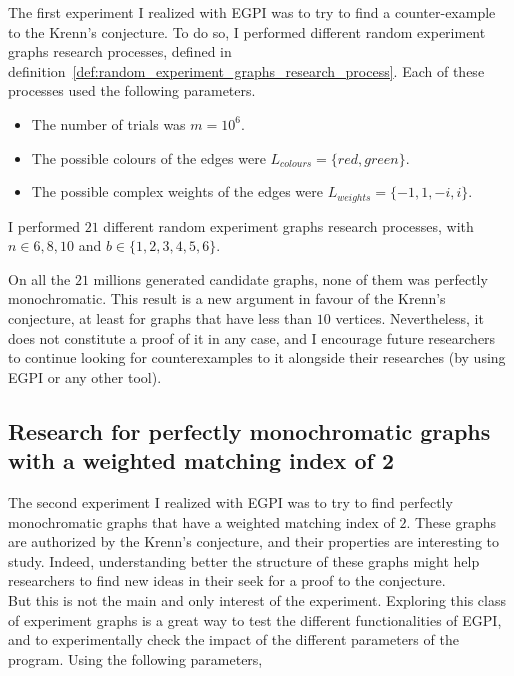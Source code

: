 The first experiment I realized with EGPI was to try to find a counter-example to the Krenn's conjecture.
To do so, I performed different random experiment graphs research processes, defined in definition~\ref{def:random_experiment_graphs_research_process}.
Each of these processes used the following parameters.

\begin{itemize}
    \item The number of trials was $m = 10^6$.
    \item The possible colours of the edges were $L_{colours} = \{red, green\}$.
    \item The possible complex weights of the edges were $L_{weights} = \{-1, 1, -i, i\}$.
\end{itemize}

I performed $21$ different random experiment graphs research processes, with $n \in {6, 8, 10}$ and $b \in \{1, 2, 3, 4, 5, 6\}$.

On all the $21$ millions generated candidate graphs, none of them was perfectly monochromatic.
This result is a new argument in favour of the Krenn's conjecture, at least for graphs that have less than $10$ vertices.
Nevertheless, it does not constitute a proof of it in any case, and I encourage future researchers to continue looking for counterexamples to it alongside their researches (by using EGPI or any other tool). \\


\subsection{Research for perfectly monochromatic graphs with a weighted matching index of 2}
\label{subsec:research-for-graphs-with-c-of-2}

The second experiment I realized with EGPI was to try to find perfectly monochromatic graphs that have a weighted matching index of $2$.
These graphs are authorized by the Krenn's conjecture, and their properties are interesting to study.
Indeed, understanding better the structure of these graphs might help researchers to find new ideas in their seek for a proof to the conjecture.\\

But this is not the main and only interest of the experiment.
Exploring this class of experiment graphs is a great way to test the different functionalities of EGPI, and to experimentally check the impact of the different parameters of the program.
Using the following parameters,

